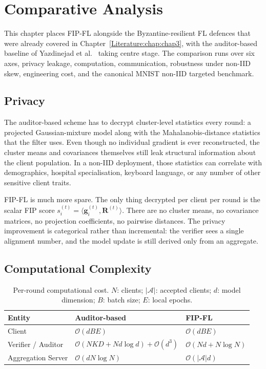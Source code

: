 \chapter{Comparative Analysis}
\label{Comparison:chap:chap8}
\graphicspath{{17.Chapter8/Images/}}
\raggedbottom

This chapter places FIP-FL alongside the Byzantine-resilient FL defences that were already covered in Chapter~\ref{Literature:chap:chap3}, with the auditor-based baseline of Yazdinejad et al.~\cite{yazdinejad2024robust} taking centre stage. The comparison runs over six axes, privacy leakage, computation, communication, robustness under non-IID skew, engineering cost, and the canonical MNIST non-IID targeted benchmark.

\section{Privacy}
\label{sec:comp-privacy}

The auditor-based scheme has to decrypt cluster-level statistics every round: a projected Gaussian-mixture model along with the Mahalanobis-distance statistics that the filter uses. Even though no individual gradient is ever reconstructed, the cluster means and covariances themselves still leak structural information about the client population. In a non-IID deployment, those statistics can correlate with demographics, hospital specialisation, keyboard language, or any number of other sensitive client traits.

FIP-FL is much more spare. The only thing decrypted per client per round is the scalar FIP score $s_i^{(t)}=\langle \mathbf{g}_i^{(t)},\mathbf{R}^{(t)}\rangle$. There are no cluster means, no covariance matrices, no projection coefficients, no pairwise distances. The privacy improvement is categorical rather than incremental: the verifier sees a single alignment number, and the model update is still derived only from an aggregate.

\section{Computational Complexity}
\label{sec:comp-compute}

\begin{table}[H]
\centering
\caption{Per-round computational cost. $N$: clients; $|\mathcal{A}|$: accepted clients; $d$: model dimension; $B$: batch size; $E$: local epochs.}
\label{tab:comp-computation}
\begin{tabular}{@{}lll@{}}
\toprule
\textbf{Entity} & \textbf{Auditor-based~\cite{yazdinejad2024robust}} & \textbf{FIP-FL} \\
\midrule
Client              & $\mathcal{O}(dBE)$ & $\mathcal{O}(dBE)$ \\
Verifier / Auditor  & $\mathcal{O}(NKD+Nd\log d)+\mathcal{O}(d^3)$ & $\mathcal{O}(Nd+N\log N)$ \\
Aggregation Server  & $\mathcal{O}(dN\log N)$ & $\mathcal{O}(|\mathcal{A}|d)$ \\
\bottomrule
\end{tabular}
\end{table}

